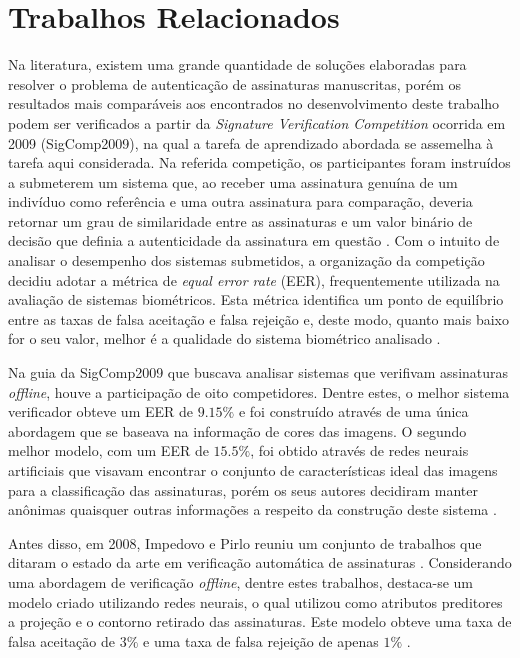 
\chapter{Trabalhos Relacionados} \label{cap:trab-rel}

Na literatura, existem uma grande quantidade de soluções elaboradas para resolver o problema de autenticação de assinaturas manuscritas, porém os resultados mais comparáveis aos encontrados no desenvolvimento deste trabalho podem ser verificados a partir da \emph{Signature Verification Competition} ocorrida em 2009 (SigComp2009), na qual a tarefa de aprendizado abordada se assemelha à tarefa aqui considerada. Na referida competição, os participantes foram instruídos a submeterem um sistema que, ao receber uma assinatura genuína de um indivíduo como referência e uma outra assinatura para comparação, deveria retornar um grau de similaridade entre as assinaturas e um valor binário de decisão que definia a autenticidade da assinatura em questão \cite{icdar2009}. Com o intuito de analisar o desempenho dos sistemas submetidos, a organização da competição decidiu adotar a métrica de \emph{equal error rate} (EER), frequentemente utilizada na avaliação de sistemas biométricos. Esta métrica identifica um ponto de equilíbrio entre as taxas de falsa aceitação e falsa rejeição e, deste modo, quanto mais baixo for o seu valor, melhor é a qualidade do sistema biométrico analisado \cite{capsi}.

Na guia da SigComp2009 que buscava analisar sistemas que verifivam assinaturas \emph{offline}, houve a participação de oito competidores. Dentre estes, o melhor sistema verificador obteve um EER de $9.15\%$ e foi construído através de uma única abordagem que se baseava na informação de cores das imagens. O segundo melhor modelo, com um EER de $15.5\%$, foi obtido através de redes neurais artificiais que visavam encontrar o conjunto de características ideal das imagens para a classificação das assinaturas, porém os seus autores decidiram manter anônimas quaisquer outras informações a respeito da construção deste sistema \cite{icdar2009, volker}.

Antes disso, em 2008, Impedovo e Pirlo reuniu um conjunto de trabalhos que ditaram o estado da arte em verificação automática de assinaturas \cite{stateOfTheArt}. Considerando uma abordagem de verificação \emph{offline}, dentre estes trabalhos, destaca-se um modelo criado utilizando redes neurais, o qual utilizou como atributos preditores a projeção e o contorno retirado das assinaturas. Este modelo obteve uma taxa de falsa aceitação de $3\%$ e uma taxa de falsa rejeição de apenas $1\%$ \cite{Bajaj}.

